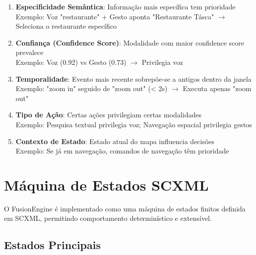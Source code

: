 \begin{enumerate}
    \item \textbf{Especificidade Semântica}: Informação mais específica tem prioridade \\
    Exemplo: Voz "restaurante" + Gesto aponta "Restaurante Tásca" $\rightarrow$ Seleciona o restaurante específico

    \item \textbf{Confiança (Confidence Score)}: Modalidade com maior confidence score prevalece \\
    Exemplo: Voz (0.92) vs Gesto (0.73) $\rightarrow$ Privilegia voz

    \item \textbf{Temporalidade}: Evento mais recente sobrepõe-se a antigos dentro da janela \\
    Exemplo: "zoom in" seguido de "zoom out" (< 2s) $\rightarrow$ Executa apenas "zoom out"

    \item \textbf{Tipo de Ação}: Certas ações privilegiam certas modalidades \\
    Exemplo: Pesquisa textual privilegia voz; Navegação espacial privilegia gestos

    \item \textbf{Contexto de Estado}: Estado atual do mapa influencia decisões \\
    Exemplo: Se já em navegação, comandos de navegação têm prioridade
\end{enumerate}

\section{Máquina de Estados SCXML}

O FusionEngine é implementado como uma máquina de estados finitos definida em SCXML, permitindo comportamento determinístico e extensível.

\subsection{Estados Principais}

